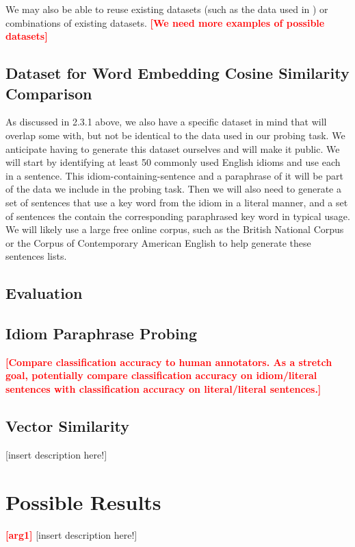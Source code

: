 \documentclass[11pt,a4paper]{article}
\newcommand{\comment}[1]{\textcolor{red}{\bf \small [#1]}}
\begin{document}
We may also be able to reuse existing datasets (such as the data used in \cite{bizzoni-lappin-2018-predicting}) or combinations of existing datasets. \comment{We need more examples of possible datasets}

\vspace{15mm}


\subsection{Dataset for Word Embedding Cosine Similarity Comparison}
As discussed in 2.3.1 above, we also have a specific dataset in mind that will overlap some with, but not be identical to the data used in our probing task. We anticipate having to generate this dataset ourselves and will make it public. We will start by identifying at least 50 commonly used English idioms and use each in a sentence. This idiom-containing-sentence and a paraphrase of it will be part of the data we include in the probing task. Then we will also need to generate a set of sentences that use a key word from the idiom in a literal manner, and a set of sentences the contain the corresponding paraphrased key word in typical usage. We will likely use a large free online corpus, such as the British National Corpus or the Corpus of Contemporary American English to help generate these sentences lists.

\subsection{Evaluation}

\subsection{Idiom Paraphrase Probing}
\comment{Compare classification accuracy to human annotators. As a stretch goal, potentially compare classification accuracy on idiom/literal sentences with classification accuracy on literal/literal sentences.}

\subsection{Vector Similarity}
\vspace{5mm}
[insert description here!]

\vspace{15mm}






\section{Possible Results}
\comment{arg1}
\vspace{5mm}
[insert description here!]
\end{document}

